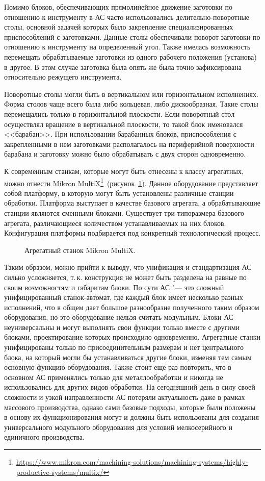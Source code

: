Помимо блоков, обеспечивающих прямолинейное движение заготовки по отношению к инструменту в АС часто использовались делительно-поворотные столы, основной задачей которых было закрепление специализированных приспособлений с заготовками. Данные столы обеспечивали поворот заготовки по отношению к инструменту на определенный угол. Также имелась возможность перемещать обрабатываемые заготовки из одного рабочего положения (установа) в другое. В этом случае заготовка была опять же была точно зафиксирована относительно режущего инструмента. 


Поворотные столы могли быть в вертикальном или горизонтальном исполнениях. Форма столов чаще всего была либо кольцевая, либо дискообразная. Такие столы перемещались только в горизонтальной плоскости. Если поворотный стол осуществлял вращение в вертикальной плоскости, то такой блок именовался <<барабан>>. При использовании барабанных блоков, приспособления с закрепленными в нем заготовками располагалось на периферийной поверхности барабана и заготовку можно было обрабатывать с двух сторон одновременно.

К современным станкам, которые могут быть отнесены к классу агрегатных, можно отнести Mikron MultiX\footnote{\url{https://www.mikron.com/machining-solutions/machining-systems/highly-productive-systems/multix/}}~(рисунок~\cref{fig:mikron}). Данное оборудование представляет собой платформу, в которую могут быть установлены различные станции обработки. Платформа выступает в качестве базового агрегата, а обрабатывающие станции являются сменными блоками. Существует три типоразмера базового агрегата, различающиеся количеством устанавливаемых на них блоков. Конфигурация платформы подбирается под конкретный технологический процесс.

\begin{figure}[ht]
	\caption{Агрегатный станок Mikron MultiX.}\label{fig:mikron}
\end{figure}

Таким образом, можно прийти к выводу, что унификация и стандартизация АС сильно усложняется, т.\,к. конструкция не может быть разделена на равные по своим возможностям и габаритам блоки. По сути АС "--- это сложный унифицированный станок-автомат, где каждый блок имеет несколько разных исполнений, что в общем дает большое разнообразие полученного таким образом оборудования, но это оборудование нельзя считать модульным. Блоки АС неуниверсальны и могут выполнять свои функции только вместе с другими блоками, проектирование которых происходило одновременно. Агрегатные станки унифицированы только по присоединительным размерам и нет центрального блока, на который могли бы устанавливаться другие блоки, изменяя тем самым основную функцию оборудования. Также стоит еще раз повторить, что в основном АС применялись только для металлообработки и никогда не использовались для других видов обработки. На сегодняшний день в силу своей сложности и узкой направленности АС потеряли актуальность даже в рамках массового производства, однако сами базовые подходы, которые были положены в основу их функционирования могут и должны быть использованы для создания универсального модульного оборудования для условий мелкосерийного и единичного производства. 

